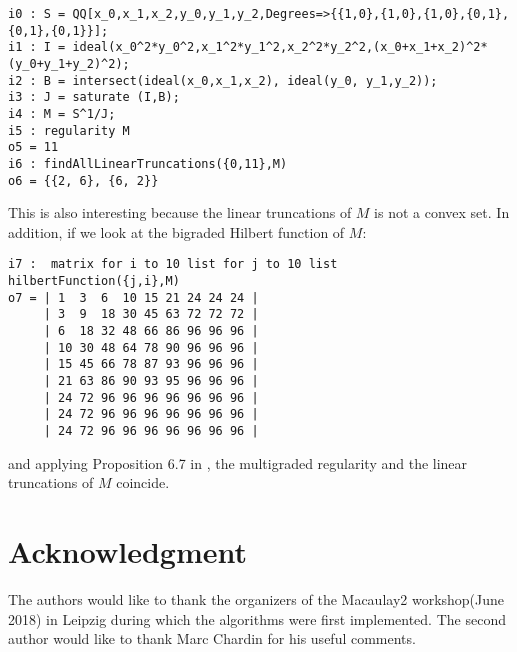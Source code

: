 \documentclass[11pt]{amsart}
\theoremstyle{definition}
\begin{document}
\begin{footnotesize}
 \begin{verbatim}
i0 : S = QQ[x_0,x_1,x_2,y_0,y_1,y_2,Degrees=>{{1,0},{1,0},{1,0},{0,1},{0,1},{0,1}}];
i1 : I = ideal(x_0^2*y_0^2,x_1^2*y_1^2,x_2^2*y_2^2,(x_0+x_1+x_2)^2*(y_0+y_1+y_2)^2);
i2 : B = intersect(ideal(x_0,x_1,x_2), ideal(y_0, y_1,y_2));
i3 : J = saturate (I,B);
i4 : M = S^1/J;
i5 : regularity M
o5 = 11
i6 : findAllLinearTruncations({0,11},M)
o6 = {{2, 6}, {6, 2}}
\end{verbatim}
\end{footnotesize}
This  is also interesting because the linear truncations of $M$ is not a convex set. In addition, if we look at the bigraded Hilbert function of $M$:
\begin{footnotesize}
 \begin{verbatim}
i7 :  matrix for i to 10 list for j to 10 list hilbertFunction({j,i},M)
o7 = | 1  3  6  10 15 21 24 24 24 |
     | 3  9  18 30 45 63 72 72 72 |
     | 6  18 32 48 66 86 96 96 96 |
     | 10 30 48 64 78 90 96 96 96 |
     | 15 45 66 78 87 93 96 96 96 |
     | 21 63 86 90 93 95 96 96 96 |
     | 24 72 96 96 96 96 96 96 96 |
     | 24 72 96 96 96 96 96 96 96 |
     | 24 72 96 96 96 96 96 96 96 |
\end{verbatim}
\end{footnotesize}
and applying Proposition 6.7 in \cite{MaclagenSmith}, the multigraded regularity and the linear truncations of $M$ coincide.


\section{Acknowledgment}
The authors would like to thank the organizers of the Macaulay2 workshop(June 2018) in Leipzig during which the algorithms were first implemented. The second author would like to thank Marc Chardin for his useful comments.



\end{document}

